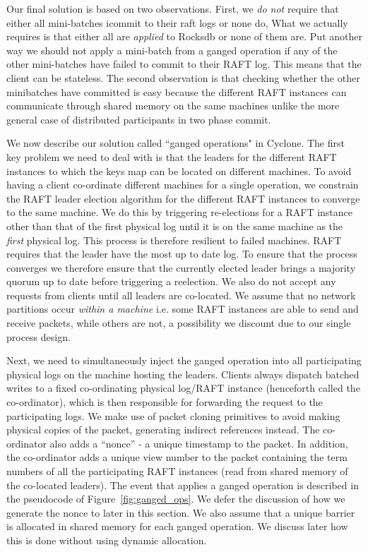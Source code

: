 \documentclass[twocolumn]{article}
\begin{document}
Our final solution is based on two observations. First, we \emph {do not} require that either all mini-batches
icommit to their raft logs or none do, What we actually requires is that either all are \emph{applied} to Rocksdb or 
none of them are. Put another way we should not apply a mini-batch from a ganged operation if any of the other mini-batches
have failed to commit to their RAFT log. This means that the client can be stateless. The second observation is that
checking whether the other minibatches have committed is easy because the different RAFT instances can communicate 
through shared memory on the same machines unlike the more general case of distributed participants in two phase 
commit.

We now describe our solution called ``ganged operations" in Cyclone. 
The first key problem we need to deal with is that the leaders for the different
RAFT instances to which the keys map can be located on different machines. To
avoid having a client co-ordinate different machines for a single operation, we
constrain the RAFT leader election algorithm for the different RAFT instances to
converge to the same machine. We do this by triggering re-elections for a RAFT
instance other than that of the first physical log until it is on the same
machine as the \emph{first} physical log. This process is therefore resilient to
failed machines. RAFT requires that the leader have the most up to date log. To
ensure that the process converges we therefore ensure that the currently elected
leader brings a majority quorum up to date before triggering a reelection. We
also do not accept any requests from clients until all leaders are
co-located. We assume that no network partitions occur \emph{within a machine}
i.e. some RAFT instances are able to send and receive packets, while others are
not, a possibility we discount due to our single process design.

Next, we need to simultaneously inject the ganged operation into all
participating physical logs on the machine hosting the leaders. Clients always
dispatch batched writes to a fixed co-ordinating physical log/RAFT instance
(henceforth called the co-ordinator), which is then responsible for forwarding
the request to the participating logs. We make use of packet cloning primitives
to avoid making physical copies of the packet, generating indirect references
instead. The co-ordinator also adds a ``nonce'' - a unique timestamp to the
packet. In addition, the co-ordinator adds a unique view number to the packet
containing the term numbers of all the participating RAFT instances (read from
shared memory of the co-located leaders).  The event that applies a ganged
operation is described in the pseudocode of Figure~\ref{fig:ganged_ops}. We
defer the discussion of how we generate the nonce to later in this section. We
also assume that a unique barrier is allocated in shared memory for each ganged
operation. We discuss later how this is done without using dynamic allocation.
\end{document}
